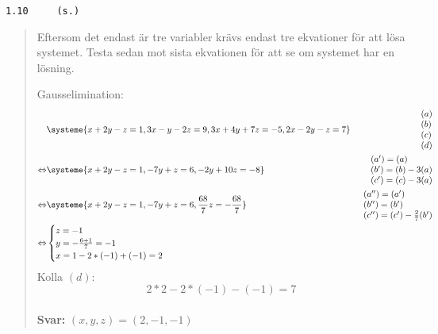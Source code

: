 \documentclass[a4paper]{article}
\newcommand{\tskcol}[1]{\textcolor{tskcol}{#1}}
\begin{document}
\pagebreak
\texttt{\tskcol{1.10~~~~ (s.)}}
\begin{quotation}
	\noindent
	Eftersom det endast är tre variabler krävs endast tre ekvationer för att lösa systemet. Testa sedan mot sista ekvationen för att se om systemet har en lösning.
	
	Gausselimination:
	\begin{align*}
	&\systeme{
		 x+2y- z=1,
		3x- y-2z=9,
		3x+4y+7z=-5,
		2x-2y- z=7}  
	&\begin{array}{l} 
	(a) \\ 
	(b) \\
	(c) \\
	(d)
	\end{array} \\ \Leftrightarrow
	&\systeme{
		 x+2y-  z=1,
		  -7y+  z=6,
		  -2y+10z=-8}  
	&\begin{array}{l} 
	(a')=(a) \\ 
	(b')=(b)-3(a) \\
	(c')=(c)-3(a)
	\end{array} \\ \Leftrightarrow
	&\systeme{
		x+2y-  z=1,
		-7y+  z=6,
		    \frac{68}{7}z=-\frac{68}{7}}  
	&\begin{array}{l} 
	(a'')=(a') \\ 
	(b'')=(b') \\
	(c'')=(c')-\frac{2}{7}(b')
	\end{array} \\ \Leftrightarrow
	&\begin{cases}
	z=-1 \\
	y=-\frac{6+1}{7}=-1 \\
	x=1-2*(-1)+(-1)=2
	\end{cases}
	\end{align*}
	Kolla $(d)$:
	\[2*2-2*(-1)-(-1)=7\]
	\\
	\textbf{Svar:} $(x,y,z)=(2,-1,-1)$
\end{quotation}
\end{document}
